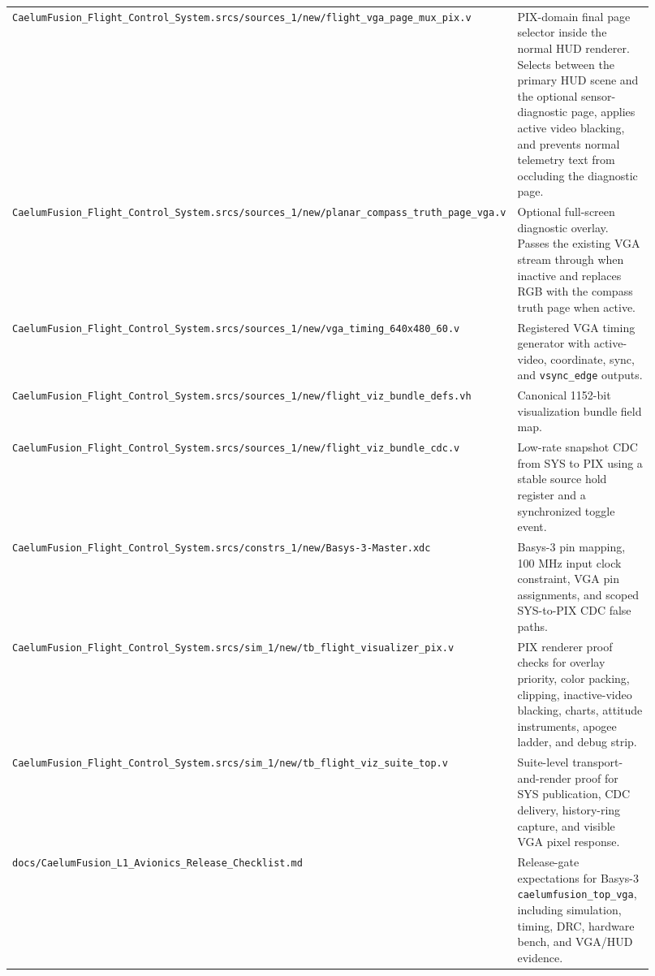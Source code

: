 \documentclass{article}
\newcommand{\sig}[1]{\begingroup\nolinkurl{#1}\endgroup}
\newcommand{\file}[1]{\begingroup\nolinkurl{#1}\endgroup}
\begin{document}
\begin{longtable}{p{0.34\linewidth} p{0.58\linewidth}}
\file{CaelumFusion_Flight_Control_System.srcs/sources_1/new/flight_vga_page_mux_pix.v} &
PIX-domain final page selector inside the normal HUD renderer.  Selects between
the primary HUD scene and the optional sensor-diagnostic page, applies active
video blacking, and prevents normal telemetry text from occluding the diagnostic
page. \\

\file{CaelumFusion_Flight_Control_System.srcs/sources_1/new/planar_compass_truth_page_vga.v} &
Optional full-screen diagnostic overlay.  Passes the existing VGA stream through
when inactive and replaces RGB with the compass truth page when active. \\

\file{CaelumFusion_Flight_Control_System.srcs/sources_1/new/vga_timing_640x480_60.v} &
Registered VGA timing generator with active-video, coordinate, sync, and
\sig{vsync_edge} outputs. \\

\file{CaelumFusion_Flight_Control_System.srcs/sources_1/new/flight_viz_bundle_defs.vh} &
Canonical 1152-bit visualization bundle field map. \\

\file{CaelumFusion_Flight_Control_System.srcs/sources_1/new/flight_viz_bundle_cdc.v} &
Low-rate snapshot CDC from SYS to PIX using a stable source hold register and a
synchronized toggle event. \\

\file{CaelumFusion_Flight_Control_System.srcs/constrs_1/new/Basys-3-Master.xdc} &
Basys-3 pin mapping, 100 MHz input clock constraint, VGA pin assignments, and
scoped SYS-to-PIX CDC false paths. \\

\file{CaelumFusion_Flight_Control_System.srcs/sim_1/new/tb_flight_visualizer_pix.v} &
PIX renderer proof checks for overlay priority, color packing, clipping,
inactive-video blacking, charts, attitude instruments, apogee ladder, and debug
strip. \\

\file{CaelumFusion_Flight_Control_System.srcs/sim_1/new/tb_flight_viz_suite_top.v} &
Suite-level transport-and-render proof for SYS publication, CDC delivery,
history-ring capture, and visible VGA pixel response. \\

\file{docs/CaelumFusion_L1_Avionics_Release_Checklist.md} &
Release-gate expectations for Basys-3 \file{caelumfusion_top_vga}, including
simulation, timing, DRC, hardware bench, and VGA/HUD evidence. \\
\bottomrule
\end{longtable}
\end{document}

